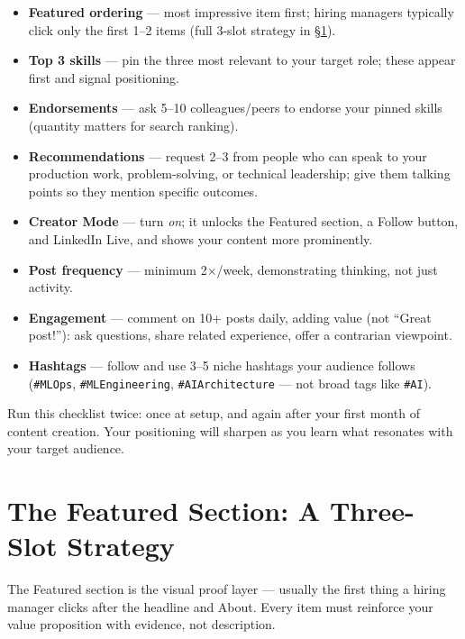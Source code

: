 \begin{itemize}
  \item \textbf{Featured ordering} --- most impressive item first; hiring managers typically click only the first
  1--2 items (full 3-slot strategy in \S\ref{sec:featured-section}).
  \item \textbf{Top 3 skills} --- pin the three most relevant to your target role; these appear first and signal
  positioning.
  \item \textbf{Endorsements} --- ask 5--10 colleagues/peers to endorse your pinned skills (quantity matters for
  search ranking).
  \item \textbf{Recommendations} --- request 2--3 from people who can speak to your production work,
  problem-solving, or technical leadership; give them talking points so they mention specific outcomes.
  \item \textbf{Creator Mode} --- turn \emph{on}; it unlocks the Featured section, a Follow button, and LinkedIn
  Live, and shows your content more prominently.
  \item \textbf{Post frequency} --- minimum 2$\times$/week, demonstrating thinking, not just activity.
  \item \textbf{Engagement} --- comment on 10+ posts daily, adding value (not ``Great post!''): ask questions,
  share related experience, offer a contrarian viewpoint.
  \item \textbf{Hashtags} --- follow and use 3--5 niche hashtags your audience follows (\texttt{\#MLOps},
  \texttt{\#MLEngineering}, \texttt{\#AIArchitecture} --- not broad tags like \texttt{\#AI}).
\end{itemize}

\begin{keytakeaway}
Run this checklist twice: once at setup, and again after your first month of content creation. Your positioning
will sharpen as you learn what resonates with your target audience.
\end{keytakeaway}

\section{The Featured Section: A Three-Slot Strategy}
\label{sec:featured-section}

The Featured section is the visual proof layer --- usually the first thing a hiring manager clicks after the
headline and About. Every item must reinforce your value proposition with evidence, not description.

